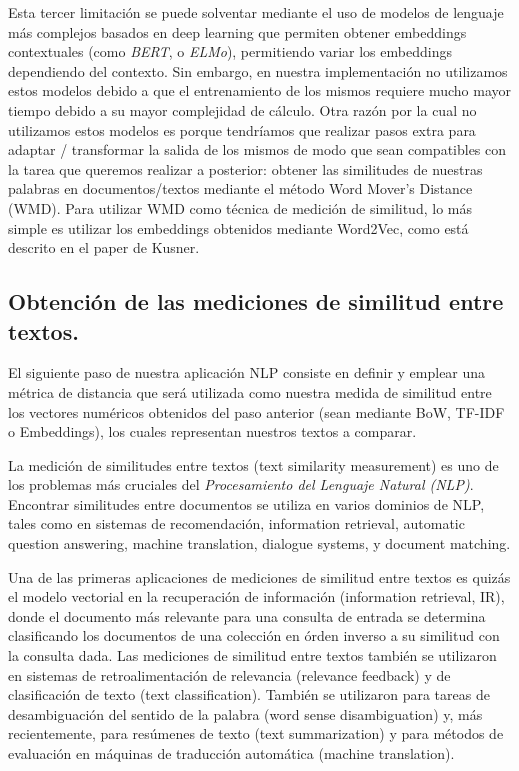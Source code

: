 \documentclass[12pt,a4paper]{article}
\begin{document}
\begin{sloppypar}
Esta tercer limitación se puede solventar mediante el uso de modelos de lenguaje más complejos basados en deep learning que permiten obtener embeddings contextuales (como \textit{BERT}, o \textit{ELMo}), permitiendo variar los embeddings dependiendo del contexto. Sin embargo, en nuestra implementación no utilizamos estos modelos debido a que el entrenamiento de los mismos requiere mucho mayor tiempo debido a su mayor complejidad de cálculo\cite{NLP_2}. Otra razón por la cual no utilizamos estos modelos es porque tendríamos que realizar pasos extra para adaptar / transformar la salida de los mismos de modo que sean compatibles con la tarea que queremos realizar a posterior: obtener las similitudes de nuestras palabras en documentos/textos mediante el método Word Mover’s Distance (WMD). Para utilizar WMD como técnica de medición de similitud, lo más simple es utilizar los embeddings obtenidos mediante Word2Vec, como está descrito en el paper de Kusner\cite{NLP_15}.
\\

\subsection{Obtención de las mediciones de similitud entre textos.}\label{med_sim_textos}

El siguiente paso de nuestra aplicación NLP consiste en definir y emplear una métrica de distancia que será utilizada como nuestra medida de similitud entre los vectores numéricos obtenidos del paso anterior (sean mediante BoW, TF-IDF o Embeddings), los cuales representan nuestros textos a comparar.

La medición de similitudes entre textos (text similarity measurement) es uno de los problemas más cruciales del \textit{Procesamiento del Lenguaje Natural (NLP)}. Encontrar similitudes entre documentos se utiliza en varios dominios de NLP, tales como en sistemas de recomendación, information retrieval, automatic question answering, machine translation, dialogue systems, y document matching\cite{similarity_survey}.

Una de las primeras aplicaciones de mediciones de similitud entre textos es quizás el modelo vectorial en la recuperación de información (information retrieval, IR), donde el documento más relevante para una consulta de entrada se determina clasificando los documentos de una colección en órden inverso a su similitud con la consulta dada. Las mediciones de similitud entre textos también se utilizaron en sistemas de retroalimentación de relevancia (relevance feedback) y de clasificación de texto (text classification). También se utilizaron para tareas de desambiguación del sentido de la palabra (word sense disambiguation) y, más recientemente, para resúmenes de texto (text summarization) y para métodos de evaluación en máquinas de traducción automática (machine translation)\cite{NLP_17_18}.


\end{sloppypar}
\end{document}

